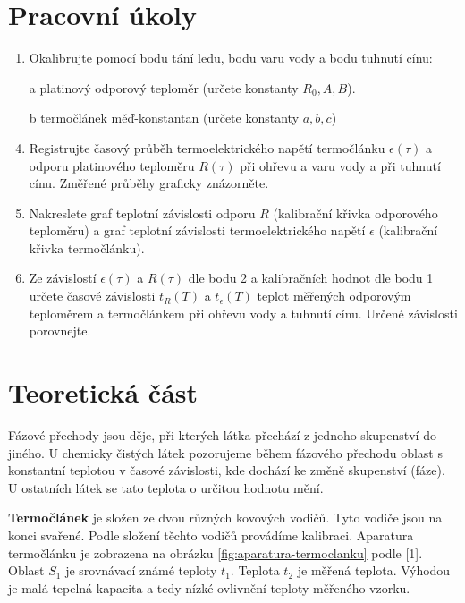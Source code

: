 \section{Pracovní úkoly}

\begin{enumerate}
\item Okalibrujte pomocí bodu tání ledu, bodu varu vody a bodu tuhnutí cínu:
\item[a] platinový odporový teploměr (určete konstanty $R_0, A, B$).
\item[b] termočlánek měď-konstantan (určete konstanty $a, b, c$)

\item Registrujte časový průběh termoelektrického napětí termočlánku $\epsilon(\tau)$ a odporu platinového teploměru $R(\tau)$ při ohřevu a varu vody a při tuhnutí cínu. Změřené průběhy graficky znázorněte.

\item Nakreslete graf teplotní závislosti odporu $R$ (kalibrační křivka odporového teploměru) a graf teplotní závislosti termoelektrického napětí $\epsilon$ (kalibrační křivka termočlánku).

\item Ze závislostí $\epsilon(\tau)$ a $R(\tau)$ dle bodu 2 a kalibračních hodnot dle bodu 1 určete časové závislosti $t_R(T)$ a $t_\epsilon(T)$ teplot měřených odporovým teploměrem a termočlánkem při ohřevu vody a tuhnutí cínu. Určené závislosti porovnejte.

\end{enumerate}

\section{Teoretická část}
Fázové přechody jsou děje, při kterých látka přechází z jednoho skupenství do jiného. U chemicky čistých látek pozorujeme během fázového přechodu oblast s konstantní teplotou v časové závislosti, kde dochází ke změně skupenství (fáze). U ostatních látek se tato teplota o určitou hodnotu mění.

\textbf{Termočlánek} je složen ze dvou různých kovových vodičů. Tyto vodiče jsou na konci svařené. Podle složení těchto vodičů provádíme kalibraci. Aparatura termočlánku je zobrazena na obrázku \ref{fig:aparatura-termoclanku} podle [1]. Oblast $S_1$ je srovnávací známé teploty $t_1$. Teplota $t_2$ je měřená teplota. Výhodou je malá tepelná kapacita a tedy nízké ovlivnění teploty měřeného vzorku.

